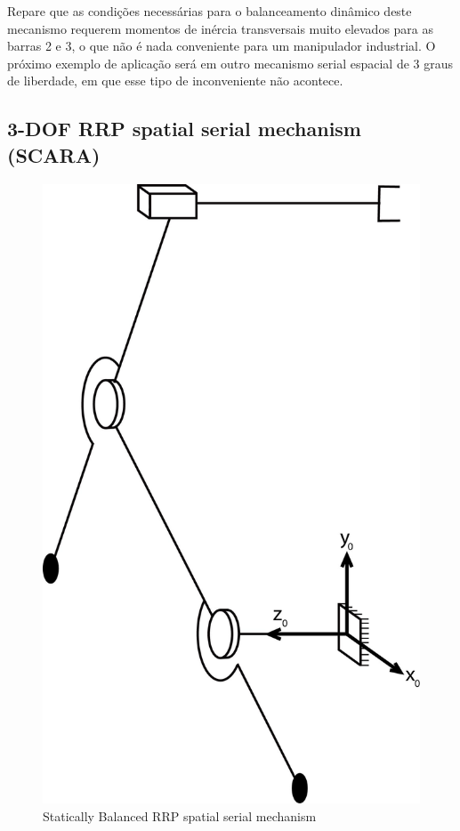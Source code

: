 \documentclass[a4paper,11pt,brazil,fleqn]{article}
\begin{document}
Repare que as condi\c{c}\~oes necess\'{a}rias para o balanceamento din\^{a}mico deste mecanismo requerem momentos de in\'{e}rcia transversais muito elevados para as barras 2 e 3, o que n\~{a}o \'{e} nada conveniente para um manipulador industrial. O pr\'{o}ximo exemplo de aplica\c{c}\~{a}o ser\'{a} em outro mecanismo serial espacial de 3 graus de liberdade, em que esse tipo de inconveniente n\~{a}o acontece.

\subsection{3-DOF RRP spatial serial mechanism (SCARA)} \label{S03-2}

\begin{figure}[H]
	\centering
	\includegraphics[scale=0.11]{RRP.jpg}  
	\caption{Statically Balanced RRP spatial serial mechanism}
	\label{fig:RRP}
\end{figure}
\end{document}
